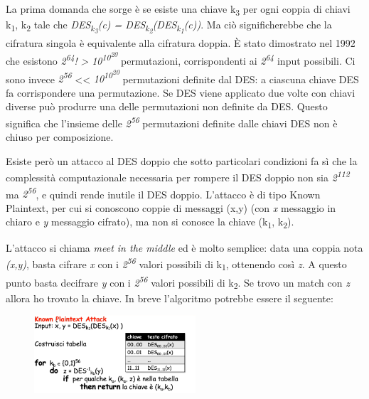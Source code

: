 La prima domanda che sorge è se esiste una chiave k\textsubscript{3} per ogni coppia di chiavi k\textsubscript{1}, k\textsubscript{2} tale che \textit{DES\textsubscript{k\textsubscript{3}}(c) = DES\textsubscript{k\textsubscript{2}}(DES\textsubscript{k\textsubscript{1}}(c))}. Ma ciò significherebbe che la cifratura singola è equivalente alla cifratura doppia. È stato dimostrato nel 1992 che esistono \textit{2\textsuperscript{64}!} \textit{>} \textit{10\textsuperscript{10\textsuperscript{20}}} permutazioni, corrispondenti ai \textit{{2\textsuperscript{64}}} input possibili. Ci sono invece \textit{{2\textsuperscript{56}}} << \textit{10\textsuperscript{10\textsuperscript{20}}} permutazioni definite dal DES: a ciascuna chiave DES fa corrispondere una permutazione. Se DES viene applicato due volte con chiavi diverse può produrre una delle permutazioni non definite da DES. Questo significa che l'insieme delle \textit{{2\textsuperscript{56}}} permutazioni definite dalle chiavi DES non è chiuso per composizione.

Esiste però un attacco al DES doppio che sotto particolari condizioni fa sì che la complessità computazionale necessaria per rompere il DES doppio non sia \textit{2\textsuperscript{112}} ma \textit{2\textsuperscript{56}}, e quindi rende inutile il DES doppio. L'attacco è di tipo Known Plaintext, per cui si conoscono coppie di messaggi (x,y) (con \textit{x} messaggio in chiaro e \textit{y} messaggio cifrato), ma non si conosce la chiave (k\textsubscript{1}, k\textsubscript{2}).

L'attacco si chiama \textit{meet in the middle} ed è molto semplice: data una coppia nota \textit{(x,y)}, basta cifrare \textit{x} con i \textit{2\textsuperscript{56}} valori possibili di k\textsubscript{1}, ottenendo così \textit{z}. A questo punto basta decifrare \textit{y} con i \textit{2\textsuperscript{56}} valori possibili di k\textsubscript{2}. Se trovo un match con \textit{z} allora ho trovato la chiave. In breve l'algoritmo potrebbe essere il seguente:

\begin{figure}[htb!]
    \centering
    \includegraphics[width=6cm]{./Images/cap1/1.12.png}
\end{figure} 

